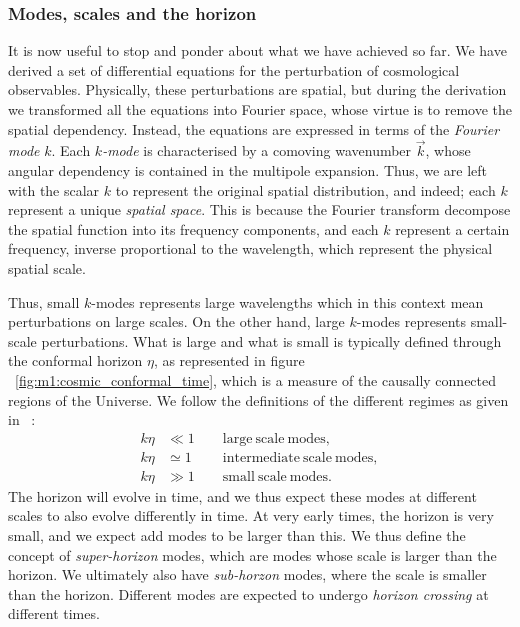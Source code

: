\subsubsection{Modes, scales and the horizon}\label{sec:m3:theory:modes_scales_horizon}
    It is now useful to stop and ponder about what we have achieved so far. We have derived a set of differential equations for the perturbation of cosmological observables. Physically, these perturbations are spatial, but during the derivation we transformed all the equations into Fourier space, whose virtue is to remove the spatial dependency. Instead, the equations are expressed in terms of the \textit{Fourier mode} $k$. Each $k$\textit{-mode} is characterised by a comoving wavenumber $\vec{k}$, whose angular dependency is contained in the multipole expansion. Thus, we are left with the scalar $k$ to represent the original spatial distribution, and indeed; each $k$ represent a unique \textit{spatial space}. This is because the Fourier transform decompose the spatial function into its frequency components, and each $k$ represent a certain frequency, inverse proportional to the wavelength, which represent the physical spatial scale. 

    Thus, small $k$-modes represents large wavelengths which in this context mean perturbations on large scales. On the other hand, large $k$-modes represents small-scale perturbations. What is large and what is small is typically defined through the conformal horizon $\eta$, as represented in figure ~\cref{fig:m1:cosmic_conformal_time}, which is a measure of the causally connected regions of the Universe. We follow the definitions of the different regimes as given in ~\cite{dodelson2020modern}:
    \begin{equation}\label{eq:m3:theory:mode_scale_definition}
        \begin{split}
            k\eta &\ll 1 \quad \quad \mathrm{large\ scale\ modes,} \\
            k\eta &\simeq 1 \quad \quad \mathrm{\ intermediate\ scale\ modes,}\\
            k\eta &\gg 1 \quad \quad \mathrm{small\ scale\ modes.}
        \end{split}
    \end{equation}
    The horizon will evolve in time, and we thus expect these modes at different scales to also evolve differently in time. At very early times, the horizon is very small, and we expect add modes to be larger than this. We thus define the concept of \textit{super-horizon} modes, which are modes whose scale is larger than the horizon. We ultimately also have \textit{sub-horzon} modes, where the scale is smaller than the horizon. Different modes are expected to undergo \textit{horizon crossing} at different times. 
    
